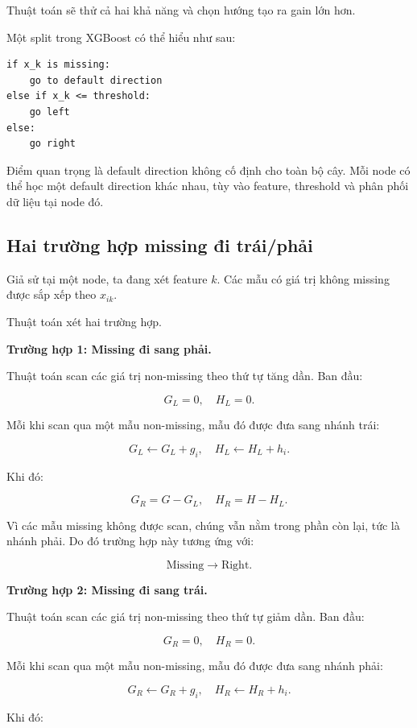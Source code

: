 Thuật toán sẽ thử cả hai khả năng và chọn hướng tạo ra gain lớn hơn.

Một split trong XGBoost có thể hiểu như sau:

\begin{lstlisting}[style=pseudocode, caption={Split với default direction}, label={lst:default_direction}]
if x_k is missing:
    go to default direction
else if x_k <= threshold:
    go left
else:
    go right
\end{lstlisting}

Điểm quan trọng là default direction không cố định cho toàn bộ cây. Mỗi node có thể học một default direction khác nhau, tùy vào feature, threshold và phân phối dữ liệu tại node đó.

\subsection{Hai trường hợp missing đi trái/phải}

Giả sử tại một node, ta đang xét feature $k$. Các mẫu có giá trị không missing được sắp xếp theo $x_{ik}$.

Thuật toán xét hai trường hợp.

\textbf{Trường hợp 1: Missing đi sang phải.}

Thuật toán scan các giá trị non-missing theo thứ tự tăng dần. Ban đầu:

\[
G_L = 0,
\quad
H_L = 0.
\]

Mỗi khi scan qua một mẫu non-missing, mẫu đó được đưa sang nhánh trái:

\[
G_L \leftarrow G_L + g_i,
\quad
H_L \leftarrow H_L + h_i.
\]

Khi đó:

\[
G_R = G - G_L,
\quad
H_R = H - H_L.
\]

Vì các mẫu missing không được scan, chúng vẫn nằm trong phần còn lại, tức là nhánh phải. Do đó trường hợp này tương ứng với:

\[
\text{Missing} \rightarrow \text{Right}.
\]

\textbf{Trường hợp 2: Missing đi sang trái.}

Thuật toán scan các giá trị non-missing theo thứ tự giảm dần. Ban đầu:

\[
G_R = 0,
\quad
H_R = 0.
\]

Mỗi khi scan qua một mẫu non-missing, mẫu đó được đưa sang nhánh phải:

\[
G_R \leftarrow G_R + g_i,
\quad
H_R \leftarrow H_R + h_i.
\]

Khi đó:

